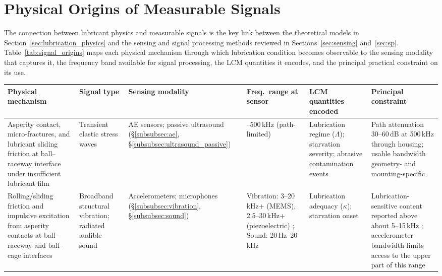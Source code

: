 
\section{Physical Origins of Measurable Signals}
\label{sec:signal_origins}
The connection between lubricant physics and measurable signals is the key link between the theoretical models in Section~\ref{sec:lubrication_physics} and the sensing and signal processing methods reviewed in Sections~\ref{sec:sensing} and~\ref{sec:sp}. Table~\ref{tab:signal_origins} maps each physical mechanism through which lubrication condition becomes observable to the sensing modality that captures it, the frequency band available for signal processing, the LCM quantities it encodes, and the principal practical constraint on its use.

\begin{table}[H]
\scriptsize
\centering
\renewcommand{\arraystretch}{1.3}
\begin{tabularx}{\linewidth}{
  >{\raggedright\arraybackslash}p{2.0cm}
  >{\raggedright\arraybackslash}p{1.7cm}
  >{\raggedright\arraybackslash}p{2.2cm}
  >{\raggedright\arraybackslash}p{1.6cm}
  >{\raggedright\arraybackslash}X
  >{\raggedright\arraybackslash}p{3.0cm}}
\hline
\textbf{Physical mechanism} & \textbf{Signal type} & \textbf{Sensing modality} & \textbf{Freq.\ range at sensor} & \textbf{LCM quantities encoded} & \textbf{Principal constraint} \\
\hline
Asperity contact, micro-fractures, and lubricant sliding friction at ball--raceway interface under insufficient lubricant film & Transient elastic stress waves & AE sensors; passive ultrasound (\S\ref{subsubsec:ae}, \S\ref{subsubsec:ultrasound_passive}) & 20--500\,kHz (path-limited) \cite{ono_comprehensive_2020,scheeren_evaluation_2022} & Lubrication regime ($\Lambda$); starvation severity; abrasive contamination events \cite{miettinen_analysis_2001,cornel_condition_2021,hou_-situ_2025,zhang_coupled_2026,delft_university_of_technology_tu_delft_influence_2024} & Path attenuation 30--60\,dB at 500\,kHz through housing; usable bandwidth geometry- and mounting-specific \cite{ono_comprehensive_2020,scheeren_evaluation_2022} \\
\hline
Rolling/sliding friction and impulsive excitation from asperity contacts at ball--raceway and ball--cage interfaces & Broadband structural vibration; radiated audible sound & Accelerometers; microphones (\S\ref{subsubsec:vibration}, \S\ref{subsubsec:sound}) & Vibration: 3--20\,kHz+ (MEMS), 2.5--30\,kHz+ (piezoelectric) \cite{murphy_choosing_2020}; Sound: 20\,Hz--20\,kHz & Lubrication adequacy ($\kappa$); starvation onset \cite{jakobsen_vibration_2021,xu_vibration-based_2024,georgiev_microphone_2017} & Lubrication-sensitive content reported above about 5--15\,kHz \cite{jakobsen_vibration_2021,jakobsen_detecting_2023}; accelerometer bandwidth limits access to the upper part of this range \\

\end{tabularx}
\end{table}
